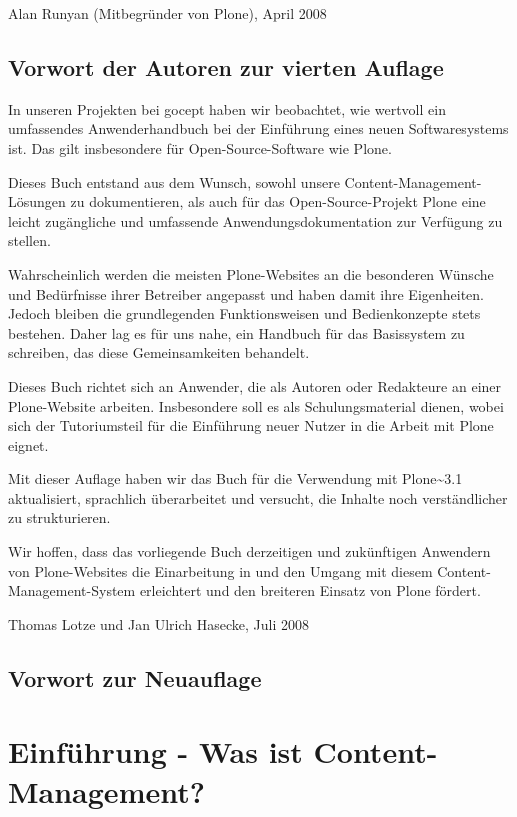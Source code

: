 \documentclass[a4paper,12pt,ngerman]{manual}
\begin{document}
Alan Runyan (Mitbegründer von Plone), April 2008


\section{Vorwort der Autoren zur vierten Auflage}

In unseren Projekten bei gocept haben wir beobachtet, wie wertvoll ein
umfassendes Anwenderhandbuch bei der Einführung eines neuen
Softwaresystems ist. Das gilt insbesondere für Open-Source-Software wie
Plone.

Dieses Buch entstand aus dem Wunsch, sowohl unsere
Content-Management-Lösungen zu dokumentieren, als auch für das
Open-Source-Projekt Plone eine leicht zugängliche und umfassende
Anwendungsdokumentation zur Verfügung zu stellen.

Wahrscheinlich werden die meisten Plone-Websites an die besonderen
Wünsche und Bedürfnisse ihrer Betreiber angepasst und haben damit ihre
Eigenheiten. Jedoch bleiben die grundlegenden Funktionsweisen und
Bedienkonzepte stets bestehen. Daher lag es für uns nahe, ein Handbuch für das
Basissystem zu schreiben, das diese Gemeinsamkeiten behandelt.

Dieses Buch richtet sich an Anwender, die als Autoren oder Redakteure an einer
Plone-Website arbeiten. Insbesondere soll es als Schulungsmaterial dienen,
wobei sich der Tutoriumsteil für die Einführung neuer Nutzer in die Arbeit mit
Plone eignet.

Mit dieser Auflage haben wir das Buch für die Verwendung mit Plone\textasciitilde{}3.1
aktualisiert, sprachlich überarbeitet und versucht, die Inhalte noch
verständlicher zu strukturieren.

Wir hoffen, dass das vorliegende Buch derzeitigen und zukünftigen Anwendern
von Plone-Websites die Einarbeitung in und den Umgang mit diesem
Content-Management-System erleichtert und den breiteren Einsatz von
Plone fördert.

Thomas Lotze und Jan Ulrich Hasecke, Juli 2008


\section{Vorwort zur Neuauflage}

\resetcurrentobjects
\hypertarget{--doc-cms/cms}{}

\hypertarget{einf-hrung-was-ist-content-management}{}\chapter{Einführung - Was ist Content-Management?}
\end{document}

